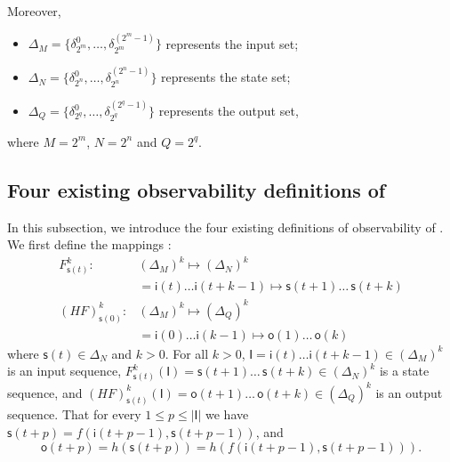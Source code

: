 %  
Moreover, 
   \begin{itemize}
 \item $\Delta_M = \{\delta^0_{2^m},\ldots,\delta^{({2^m}-1)}_{2^m} \}$ represents the input set; 
 \item $\Delta_N = \{\delta^0_{2^n},\ldots,\delta^{({2^n}-1)}_{2^n} \}$ represents the state set; 
 \item $\Delta_Q = \{\delta^0_{2^q},\ldots,\delta^{({2^q}-1)}_{2^q} \}$ represents the output set,
\end{itemize}
where $M=2^m$, $N=2^n$ and $Q=2^q$.

\subsection{Four existing observability definitions of \BCNs}
In this subsection, we introduce the four existing definitions of observability of \BCNs. 
We first define the mappings \cite{Zhang2016Observability}:
\begin{equation}
\begin{split}
F^k_{\mathsf{s}(t)}:& (\Delta_M)^k\mapsto(\Delta_N)^k\\
&=\mathsf{i}(t)\ldots \mathsf{i}({t+k-1}) \mapsto \mathsf{s}(t+1) \ldots\, \mathsf{s}(t+k)\\
(HF)^k_{\mathsf{s}(0)} :& (\Delta_M)^k\mapsto(\Delta_Q)^k\\
 &=\mathsf{i}(0)\ldots \mathsf{i}(k-1) \mapsto \mathsf{o}(1)\ldots\, \mathsf{o}(k)
\end{split}
\label{equ:6}
\end{equation}
where $\mathsf{s}(t)\in \Delta_N$ and $k>0$. For all  $k>0$,
$\mathsf{I}=\mathsf{i}(t)\ldots \mathsf{i}({t+k-1}) \in(\Delta_M)^k$
is an input sequence, 
$F^k_{\mathsf{s}(t)}(\mathsf{I})=\mathsf{s}(t+1) \ldots\, \mathsf{s}(t+k) \in(\Delta_N)^k$
 is a state sequence, and 
 $(HF)^k_{\mathsf{s}(t)}(\mathsf{I})=\mathsf{o}(t+1)\ldots\, \mathsf{o}(t+k) \in(\Delta_Q)^k$
 is an output sequence. That for every $1\le p \le |\mathsf{I}|$ we have 
 $\mathsf{s}(t+p)=f(\mathsf{i}(t+p-1),\mathsf{s}(t+p-1))$,
and 
 \[\mathsf{o}(t+p)=h(\mathsf{s}(t+p))=h(f(\mathsf{i}(t+p-1),\mathsf{s}(t+p-1))).\] 

